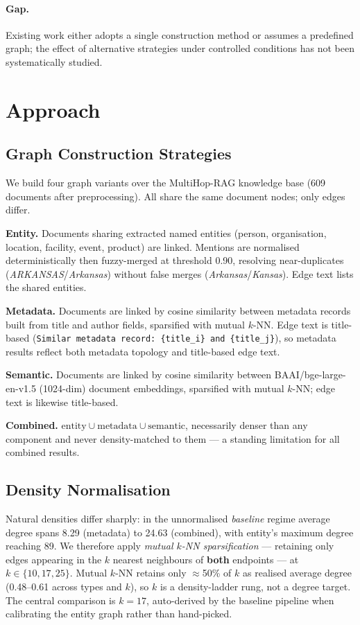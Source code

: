 \documentclass[11pt]{article}
\begin{document}
\paragraph{Gap.} Existing work either adopts a single construction method or assumes a predefined graph; the effect of alternative strategies under controlled conditions has not been systematically studied.

\section{Approach}

\subsection{Graph Construction Strategies}

We build four graph variants over the MultiHop-RAG knowledge base (609 documents after preprocessing). All share the same document nodes; only edges differ.

\textbf{Entity.} Documents sharing extracted named entities (person, organisation, location, facility, event, product) are linked. Mentions are normalised deterministically then fuzzy-merged at threshold 0.90, resolving near-duplicates (\textit{ARKANSAS}/\textit{Arkansas}) without false merges (\textit{Arkansas}/\textit{Kansas}). Edge text lists the shared entities.

\textbf{Metadata.} Documents are linked by cosine similarity between metadata records built from title and author fields, sparsified with mutual $k$-NN. Edge text is title-based (\texttt{Similar metadata record: \{title\_i\} and \{title\_j\}}), so metadata results reflect both metadata topology and title-based edge text.

\textbf{Semantic.} Documents are linked by cosine similarity between BAAI/bge-large-en-v1.5 (1024-dim) document embeddings, sparsified with mutual $k$-NN; edge text is likewise title-based.

\textbf{Combined.} $\text{entity} \cup \text{metadata} \cup \text{semantic}$, necessarily denser than any component and never density-matched to them --- a standing limitation for all combined results.

\subsection{Density Normalisation}

Natural densities differ sharply: in the unnormalised \textit{baseline} regime average degree spans 8.29 (metadata) to 24.63 (combined), with entity's maximum degree reaching 89. We therefore apply \textit{mutual $k$-NN sparsification} --- retaining only edges appearing in the $k$ nearest neighbours of \textbf{both} endpoints --- at $k \in \{10, 17, 25\}$. Mutual $k$-NN retains only $\approx$50\% of $k$ as realised average degree (0.48--0.61 across types and $k$), so $k$ is a density-ladder rung, not a degree target. The central comparison is $k{=}17$, auto-derived by the baseline pipeline when calibrating the entity graph rather than hand-picked.
\end{document}
